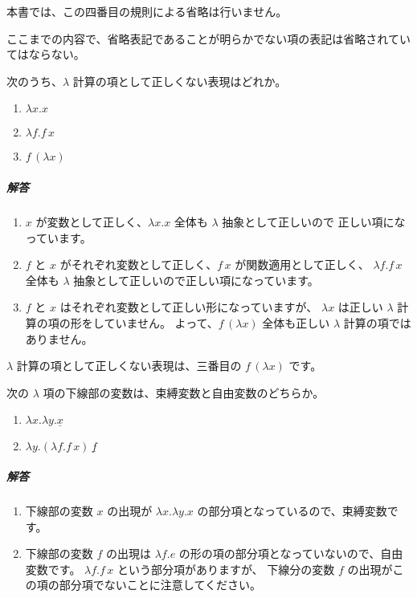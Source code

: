 本書では、この四番目の規則による省略は行いません。

\begin{note}
ここまでの内容で、省略表記であることが明らかでない項の表記は省略されていてはならない。
\end{note}

\begin{exercise}

次のうち、$\lambda$ 計算の項として正しくない表現はどれか。

\begin{enumerate}
  \item $\lambda x . x$
  \item $\lambda f . f \, x$
  \item $f \, (\lambda x)$
\end{enumerate}

\subparagraph{解答}

\begin{enumerate}
  \item $x$ が変数として正しく、$\lambda x . x$ 全体も $\lambda$ 抽象として正しいので
        正しい項になっています。
  \item $f$ と $x$ がそれぞれ変数として正しく、$f \, x$ が関数適用として正しく、
        $\lambda f . f \, x$ 全体も $\lambda$ 抽象として正しいので正しい項になっています。
  \item $f$ と $x$ はそれぞれ変数として正しい形になっていますが、
        $\lambda x$ は正しい $\lambda$ 計算の項の形をしていません。
        よって、$f \, (\lambda x)$ 全体も正しい $\lambda$ 計算の項ではありません。
\end{enumerate}

$\lambda$ 計算の項として正しくない表現は、三番目の $f \, (\lambda x)$ です。

\end{exercise}

\begin{exercise}

次の $\lambda$ 項の下線部の変数は、束縛変数と自由変数のどちらか。

\begin{enumerate}
  \item $\lambda x . \lambda y . \underline{x}$
  \item $\lambda y . (\lambda f . f \, x) \, \underline{f}$
\end{enumerate}

\subparagraph{解答}

\begin{enumerate}
  \item 下線部の変数 $x$ の出現が $\lambda x . \lambda y . x$ の部分項となっているので、束縛変数です。
  \item 下線部の変数 $f$ の出現は $\lambda f . e$ の形の項の部分項となっていないので、自由変数です。
        $\lambda f . f \, x$ という部分項がありますが、
        下線分の変数 $f$ の出現がこの項の部分項でないことに注意してください。
\end{enumerate}

\end{exercise}

